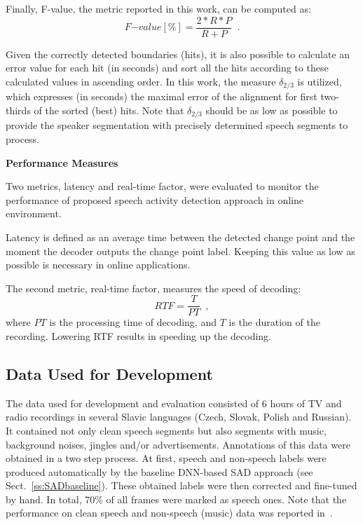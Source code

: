 \documentclass[FM,noheader,EN,bwtitles]{tulthesis}
\begin{document}
Finally, \mbox{F-value}, the metric reported in this work, can be computed as: 
\begin{equation}
F{-value} [\%] = \frac{2*R*P}{R+P} \enspace.
\label{eq:fval}\end{equation}

Given the correctly detected boundaries (hits), it is also possible to calculate an error value for each hit (in seconds) and sort all the hits according to these calculated values in ascending order.
In this work, the measure $\delta_{2/3}$ is utilized, which expresses (in seconds) the maximal error of the alignment for first two-thirds of the sorted (best) hits.
Note that $\delta_{2/3}$ should be as low as possible to provide the speaker segmentation with precisely determined speech segments to process.

\bigskip
\noindent
\textbf{Performance Measures}
\medskip

\noindent 
Two metrics, latency and real-time factor, were evaluated to monitor the performance of proposed speech activity detection approach in online environment.

Latency is defined as an average time between the detected change point and the moment the decoder outputs the change point label.
Keeping this value as low as possible is necessary in online applications.

The second metric, real-time factor, measures the speed of decoding:
\begin{equation}
RTF=\frac{T}{PT} \enspace,
\label{eq:rtf}\end{equation}
where $PT$ is the processing time of decoding, and $T$ is the duration of the recording.
Lowering RTF results in speeding up the decoding.

\subsection{Data Used for Development}
\label{ss:SADdata}
The data used for development and evaluation consisted of 6 hours of TV and radio recordings in several Slavic languages (Czech, Slovak, Polish and Russian). 
It contained not only clean speech segments but also segments with music, background noises, jingles and/or advertisements.
Annotations of this data were obtained in a two step process.
At first, speech and non-speech labels were produced automatically by the baseline DNN-based SAD approach (see Sect.~\ref{ss:SADbaseline}).
These obtained labels were then corrected and fine-tuned by hand.
In total, 70\% of all frames were marked as speech ones.
Note that the performance on clean speech and non-speech (music) data was reported in~\parencite{SIGMAP16}.
\end{document}

